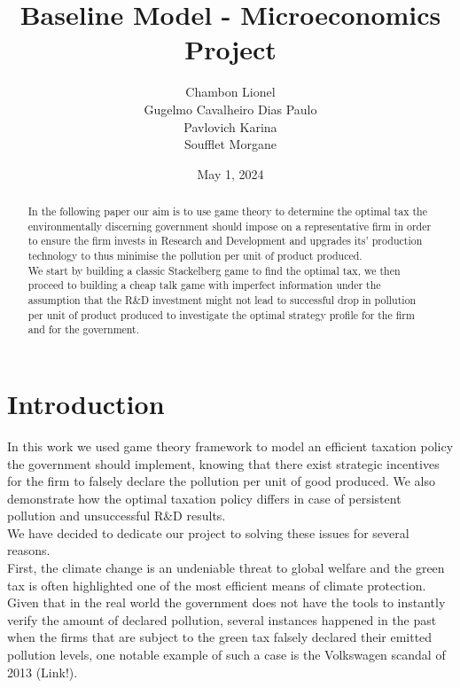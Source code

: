\documentclass{article}
\title{Baseline Model - Microeconomics Project}
\author{Chambon Lionel \\ Gugelmo Cavalheiro Dias Paulo \\ Pavlovich Karina \\ Soufflet Morgane}
\date{May 1, 2024}
\begin{document}
\maketitle

\begin{abstract}
    In the following paper our aim is to use game theory to determine the optimal tax the environmentally discerning government should impose on a representative firm in order to ensure the firm invests in Research and Development and upgrades its' production technology to thus minimise the pollution per unit of product produced. \\

    We start by building a classic Stackelberg game to find the optimal tax, we then proceed to building a cheap talk game with imperfect information under the assumption that the R\&D investment might not lead to successful drop in pollution per unit of product produced to investigate the optimal strategy profile for the firm and for the government.  
\end{abstract}

\pagebreak
\tableofcontents
\pagebreak

\section{Introduction}

In this work we used game theory framework to model an efficient taxation policy the government should implement, knowing that there exist strategic incentives for the firm to falsely declare the pollution per unit of good produced. We also demonstrate how the optimal taxation policy differs in case of persistent pollution and unsuccessful R\&D results. \\

We have decided to dedicate our project to solving these issues for several reasons. \\

First, the climate change is an undeniable threat to global welfare and the green tax is often highlighted one of the most efficient means of climate protection.\\

Given that in the real world the government does not have the tools to instantly verify the amount of declared pollution, several instances happened in the past when the firms that are subject to the green tax falsely declared their emitted pollution levels, one notable example of such a case is the Volkswagen scandal of 2013 (Link!). \\
\end{document}
